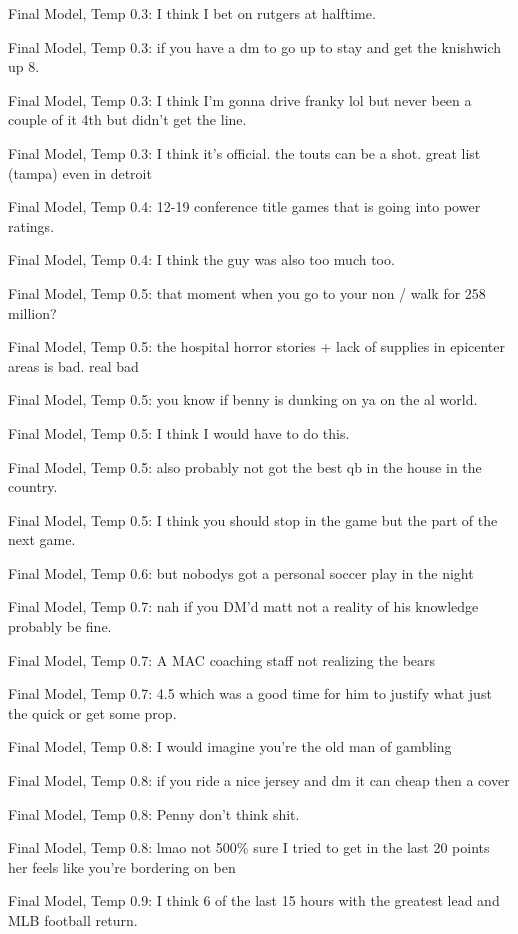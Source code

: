 \documentclass[5p,authoryear]{elsarticle}
\begin{document}
Final Model, Temp 0.3: 
I think I bet on rutgers at halftime.

Final Model, Temp 0.3: if you have a dm to go up to stay and get the knishwich up 8.

Final Model, Temp 0.3: I think I’m gonna drive franky lol but never been a couple of it 4th but didn’t get the line. 

Final Model, Temp 0.3: I think it’s official. the touts can be a shot. great list (tampa) even in detroit 

Final Model, Temp 0.4: 
12-19 conference title games that is going into power ratings.


Final Model, Temp 0.4: I think the guy was also too much too.

Final Model, Temp 0.5: 
that moment when you go to your non / walk for 258 million?

Final Model, Temp 0.5: the hospital horror stories + lack of supplies in epicenter areas is bad. real bad

Final Model, Temp 0.5: you know if benny is dunking on ya on the al world.

Final Model, Temp 0.5: I think I would have to do this.

Final Model, Temp 0.5: also probably not got the best qb in the house in the country.

Final Model, Temp 0.5: I think you should stop in the game but the part of the next game. 

Final Model, Temp 0.6: 
but nobodys got a personal soccer play in the night

Final Model, Temp 0.7: 
nah if you DM’d matt not a reality of his knowledge probably be fine. 

Final Model, Temp 0.7: A MAC coaching staff not realizing the bears

Final Model, Temp 0.7: 4.5 which was a good time for him to justify what just the quick or get some prop.

Final Model, Temp 0.8: 
I would imagine you’re the old man of gambling

Final Model, Temp 0.8: if you ride a nice jersey and dm it can cheap then a cover 

Final Model, Temp 0.8: Penny don’t think shit.

Final Model, Temp 0.8: lmao not 500\% sure I tried to get in the last 20 points her
feels like you’re bordering on ben 

Final Model, Temp 0.9: 
I think 6 of the last 15 hours with the greatest lead and MLB football return.
\end{document}
